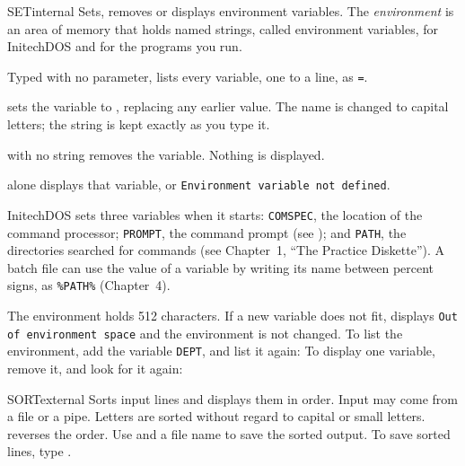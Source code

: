 
\begin{DosEntry}{SET}{}{internal}
\Purpose Sets, removes or displays environment variables.
\Format {}
\Remarks
The \emph{environment} is an area of memory that holds named strings, called
environment variables, for InitechDOS and for the programs you run.

Typed with no parameter,  lists every variable, one to a line, as
\texttt{=}.

 sets the variable  to , replacing
any earlier value.  The name is changed to capital letters; the string is
kept exactly as you type it.

 with no string removes the variable.  Nothing is displayed.

 alone displays that variable, or
\texttt{Environment variable not defined}.

InitechDOS sets three variables when it starts: \texttt{COMSPEC}, the
location of the command processor; \texttt{PROMPT}, the command prompt (see
); and \texttt{PATH}, the directories searched for commands
(see Chapter~1, ``The Practice Diskette'').  A batch file can use the value
of a variable by writing its name between percent signs, as
\texttt{\%PATH\%} (Chapter~4).

The environment holds 512 characters.  If a new variable does not fit,
 displays \texttt{Out of environment space} and the environment is
not changed.
\Example
To list the environment, add the variable \texttt{DEPT}, and list it
again:
To display one variable, remove it, and look for it again:
\end{DosEntry}

\begin{DosEntry}{SORT}{}{external}
\Purpose Sorts input lines and displays them in order.
\Format {}
\Remarks
Input may come from a file or a pipe. Letters are sorted without regard
to capital or small letters.  reverses the order. Use \type{>}
and a file name to save the sorted output.
\Example
To save sorted lines, type .
\end{DosEntry}

